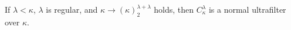 \documentclass{book}%
\begin{document}
\begin{theorem} If\/ $\lambda < \kappa$,
$\lambda$ is regular, and $\kappa
\to (\kappa)^{\lambda + \lambda}_{2}$ holds, then $C^{\lambda}_{\kappa}$
is a normal ultrafilter over $\kappa$.
\end{theorem}




\end{document}
